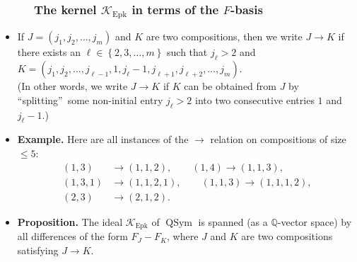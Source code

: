 \documentclass{beamer}
\newcommand{\Epk}{\operatorname{Epk}}
\newcommand{\calK}{\mathcal{K}}
\newcommand{\fti}[1]{\frametitle{\ \ \ \ \ #1}}
\newcommand{\defn}[1]{{\color{darkred}\emph{#1}}} %
\theoremstyle{plain}
\begin{document}
\begin{frame}
\fti{The kernel $\calK_{\Epk}$ in terms of the $F$-basis}

\begin{itemize}

\item If $J=\left(  j_{1},j_{2},\ldots,j_{m}\right)  $ and $K$
are two compositions, then we write \defn{$J\rightarrow K$} if there exists an
$\ell\in\left\{  2,3,\ldots,m\right\}  $ such that $j_{\ell}>2$ and $K=\left(
j_{1},j_{2},\ldots,j_{\ell-1},1,j_{\ell}-1,j_{\ell+1},j_{\ell+2},\ldots
,j_{m}\right)  $. \\
(In other words, we write $J\rightarrow K$ if $K$ can be
obtained from $J$ by \textquotedblleft splitting\textquotedblright\ some
non-initial entry
$j_{\ell}>2$ into two consecutive entries $1$ and $j_{\ell}-1$.)

\item \textbf{Example.} Here are all instances of the $\to$ relation
on compositions of size $\leq 5$:
\begin{align*}
\left(  1,3\right)  &\rightarrow\left(  1,1,2\right)  , \qquad
\left(  1,4\right)    \rightarrow\left(  1,1,3\right)  ,\\
\left(  1,3,1\right)   &\rightarrow\left(  1,1,2,1\right)  ,\qquad
\left(  1,1,3\right)   \rightarrow\left(  1,1,1,2\right)  ,\\
\left(  2,3\right)  & \rightarrow\left(  2,1,2\right)  .
\end{align*}

\item \textbf{Proposition.}
The ideal $\mathcal{K}_{\operatorname*{Epk}}$ of $\operatorname*{QSym}$ is
spanned (as a $\mathbb{Q}$-vector space) by all differences of the form
$F_{J}-F_{K}$, where $J$ and $K$ are two compositions satisfying $J\rightarrow
K$.

\end{itemize}

\end{frame}
\end{document}
